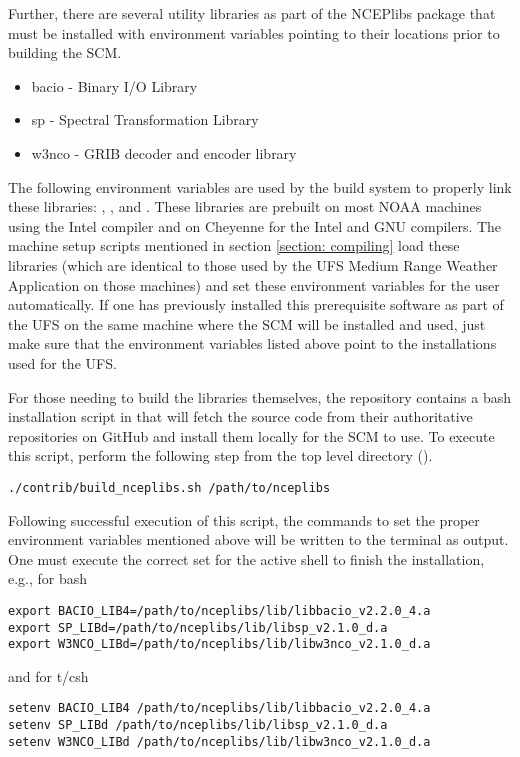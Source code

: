 Further, there are several utility libraries as part of the NCEPlibs package that must be installed with environment variables pointing to their locations prior to building the SCM.
\begin{itemize}
    \item bacio - Binary I/O Library
    \item sp - Spectral Transformation Library
    \item w3nco - GRIB decoder and encoder library
\end{itemize}
The following environment variables are used by the build system to properly link these libraries: , , and .  These libraries are prebuilt on most NOAA machines using the Intel compiler and on Cheyenne for the Intel and GNU compilers. The machine setup scripts mentioned in section \ref{section: compiling} load these libraries (which are identical to those used by the UFS Medium Range Weather Application on those machines) and set these environment variables for the user automatically. If one has previously installed this prerequisite software as part of the UFS on the same machine where the SCM will be installed and used, just make sure that the environment variables listed above point to the installations used for the UFS.

For those needing to build the libraries themselves, the repository contains a bash installation script in  that will fetch the source code from their authoritative repositories on GitHub and install them locally for the SCM to use. To execute this script, perform the following step from the top level directory (). 

\begin{lstlisting}
./contrib/build_nceplibs.sh /path/to/nceplibs
\end{lstlisting}

Following successful execution of this script, the commands to set the proper environment variables mentioned above will be written to the terminal as output. One must execute the correct set for the active shell to finish the installation, e.g., for bash
\begin{lstlisting}
export BACIO_LIB4=/path/to/nceplibs/lib/libbacio_v2.2.0_4.a
export SP_LIBd=/path/to/nceplibs/lib/libsp_v2.1.0_d.a
export W3NCO_LIBd=/path/to/nceplibs/lib/libw3nco_v2.1.0_d.a
\end{lstlisting}
and for t/csh
\begin{lstlisting}
setenv BACIO_LIB4 /path/to/nceplibs/lib/libbacio_v2.2.0_4.a
setenv SP_LIBd /path/to/nceplibs/lib/libsp_v2.1.0_d.a
setenv W3NCO_LIBd /path/to/nceplibs/lib/libw3nco_v2.1.0_d.a
\end{lstlisting}

